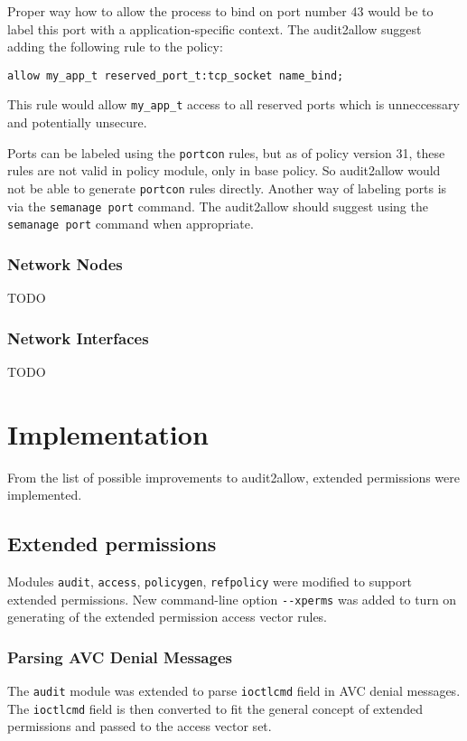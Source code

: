 Proper way how to allow the process to bind on port number 43 would be to label
this port with a application-specific context. The audit2allow suggest adding
the following rule to the policy:
\begin{lstlisting}
allow my_app_t reserved_port_t:tcp_socket name_bind;
\end{lstlisting}
This rule would allow \texttt{my\_app\_t} access to all reserved ports which is
unneccessary and potentially unsecure.

Ports can be labeled using the \texttt{portcon} rules, but as of policy version
31, these rules are not valid in policy module, only in base policy. So
audit2allow would not be able to generate \texttt{portcon} rules directly.
Another way of labeling ports is via the \texttt{semanage port} command. The
audit2allow should suggest using the \texttt{semanage port} command when
appropriate.

\subsection{Network Nodes}
TODO

\subsection{Network Interfaces}
TODO

\chapter{Implementation}
From the list of possible improvements to audit2allow, extended permissions were
implemented.

\section{Extended permissions}
Modules \texttt{audit}, \texttt{access}, \texttt{policygen}, \texttt{refpolicy}
were modified to support extended permissions. New command-line option
\texttt{-{}-xperms} was added to turn on generating of the extended permission
access vector rules.

\subsection{Parsing AVC Denial Messages}
The \texttt{audit} module was extended to parse \texttt{ioctlcmd} field in AVC
denial messages. The \texttt{ioctlcmd} field is then converted to fit the
general concept of extended permissions and passed to the access vector set.

